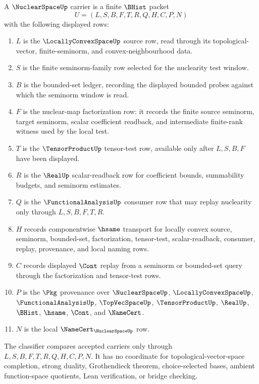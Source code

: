 \begin{definition}
\label{def:nuclear-space-carrier}
A $\NuclearSpaceUp$ carrier is a finite $\BHist$ packet
$$
U=(L,S,B,F,T,R,Q,H,C,P,N)
$$
with the following displayed rows:
\begin{enumerate}
\item $L$ is the $\LocallyConvexSpaceUp$ source row, read through its topological-vector, finite-seminorm, and convex-neighbourhood data.
\item $S$ is the finite seminorm-family row selected for the nuclearity test window.
\item $B$ is the bounded-set ledger, recording the displayed bounded probes against which the seminorm window is read.
\item $F$ is the nuclear-map factorization row: it records the finite source seminorm, target seminorm, scalar coefficient readback, and intermediate finite-rank witness used by the local test.
\item $T$ is the $\TensorProductUp$ tensor-test row, available only after $L,S,B,F$ have been displayed.
\item $R$ is the $\RealUp$ scalar-readback row for coefficient bounds, summability budgets, and seminorm estimates.
\item $Q$ is the $\FunctionalAnalysisUp$ consumer row that may replay nuclearity only through $L,S,B,F,T,R$.
\item $H$ records componentwise $\hsame$ transport for locally convex source, seminorm, bounded-set, factorization, tensor-test, scalar-readback, consumer, replay, provenance, and local naming rows.
\item $C$ records displayed $\Cont$ replay from a seminorm or bounded-set query through the factorization and tensor-test rows.
\item $P$ is the $\Pkg$ provenance over $\NuclearSpaceUp$, $\LocallyConvexSpaceUp$, $\FunctionalAnalysisUp$, $\TopVecSpaceUp$, $\TensorProductUp$, $\RealUp$, $\BHist$, $\hsame$, $\Cont$, and $\NameCert$.
\item $N$ is the local $\NameCert_{\NuclearSpaceUp}$ row.
\end{enumerate}
The classifier compares accepted carriers only through $L,S,B,F,T,R,Q,H,C,P,N$. It has no coordinate for topological-vector-space completion, strong duality, Grothendieck theorem, choice-selected bases, ambient function-space quotients, Lean verification, or bridge checking.
\end{definition}

